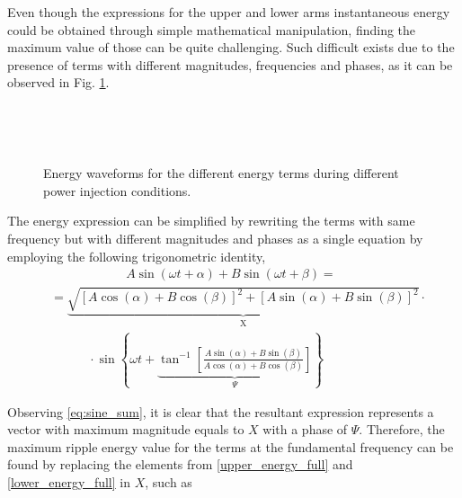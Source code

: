 \documentclass[journal]{IEEEtran}
\begin{document}
Even though the expressions for the upper and lower arms instantaneous energy could be obtained through simple mathematical manipulation, finding the maximum value of those can be quite challenging. Such difficult exists due to the presence of terms with different magnitudes, frequencies and phases, as it can be observed in Fig. \ref{fig:Energy_ripple}.
~
\begin{figure}[!h]
\centerline{}
\centering
{}
\centering
{}~
\caption{Energy waveforms for the different energy terms during different power injection conditions.}~
\label{fig:Energy_ripple}
\end{figure}

The energy expression can be simplified by rewriting the terms with same frequency but with different magnitudes and phases as a single equation by employing the following trigonometric identity,
~
\begin{align}
&\qquad\qquad\qquad A\sin(\omega t + \alpha) + B\sin(\omega t + \beta) = \nonumber\\
&= \underbrace{\sqrt{\left[A\cos(\alpha) + B\cos(\beta) \right]^2 + \left[A\sin(\alpha) + B\sin(\beta) \right]^2}}_\text{X} \cdot \nonumber\\
&\qquad\quad \cdot \sin\left\lbrace\omega t + \underbrace{\tan^{-1}\left[\frac{A\sin(\alpha) + B\sin(\beta)}{A\cos(\alpha) + B\cos(\beta)}\right]}_\text{$\Psi$}\right\rbrace
\label{eq:sine_sum}
\end{align}

Observing \eqref{eq:sine_sum}, it is clear that the resultant expression represents a vector with maximum magnitude equals to $X$ with a phase of $\Psi$. Therefore, the maximum ripple energy value for the terms at the fundamental frequency can be found by replacing the elements from \eqref{upper_energy_full} and \eqref{lower_energy_full} in $X$, such as
%
%

\end{document}
